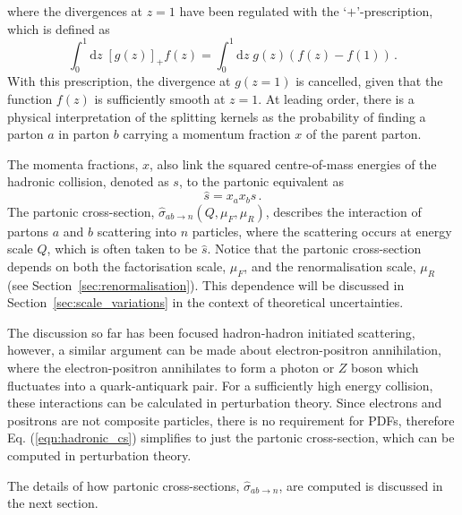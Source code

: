 \documentclass[main.tex]{subfiles}
\begin{document}
    where the divergences at $z=1$ have been regulated
    with the `$+$'-prescription, which is defined as
    \begin{equation}\label{eqn:plus_prescription}
        \int_{0}^{1} \mathrm{d}z \; [g(z)]_{+}f(z) = \int_{0}^{1}\mathrm{d}z \; g(z)(f(z)-f(1)) \, .
    \end{equation}
    With this prescription, the divergence at $g(z=1)$ is cancelled,
    given that the function $f(z)$ is sufficiently smooth at $z=1$.
    At leading order, there is a physical interpretation
    of the splitting kernels as the probability of finding a parton
    $a$ in parton $b$ carrying a momentum fraction $x$ of the parent parton.
    
    The momenta fractions, $x$, also link the
    squared centre-of-mass energies of the hadronic collision,
    denoted as $s$, to the partonic equivalent as
    \begin{equation}\label{eqn:E_cm_partonic}
        \hat{s} = x_{a}x_{b}s \, .
    \end{equation}
    The partonic cross-section, $\hat{\sigma}_{ab \rightarrow n}(Q, \mu_{F}, \mu_{R})$,
    describes the interaction of
    partons $a$ and $b$ scattering into $n$ particles,
    where the scattering occurs at energy scale $Q$,
    which is often taken to be $\hat{s}$.
    Notice that the partonic cross-section depends on
    both the factorisation scale, $\mu_{F}$, and
    the renormalisation scale, $\mu_{R}$
    (see Section~\ref{sec:renormalisation}). This dependence will
    be discussed in Section~\ref{sec:scale_variations}
    in the context of theoretical uncertainties.

    The discussion so far has been focused hadron-hadron
    initiated scattering, however, a similar argument
    can be made about electron-positron annihilation,
    where the electron-positron annihilates to form a
    photon or $Z$ boson which fluctuates into a quark-antiquark
    pair. For a sufficiently high energy collision,
    these interactions can be calculated in perturbation
    theory.
    Since electrons and positrons are not composite
    particles, there is no requirement for PDFs,
    therefore Eq. (\ref{eqn:hadronic_cs}) simplifies
    to just the partonic cross-section, which
    can be computed in perturbation theory.
    
    The details of how partonic cross-sections, $\hat{\sigma}_{ab \rightarrow n}$,
    are computed is discussed in the next section.
\end{document}
